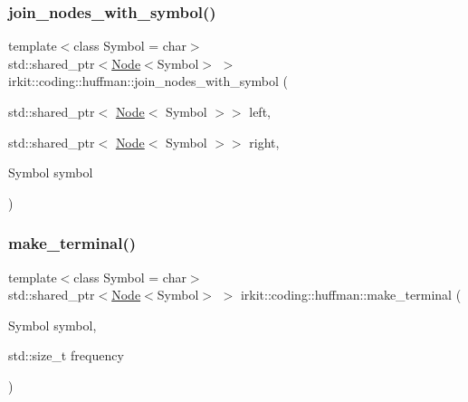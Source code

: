 \mbox{\label{namespaceirkit_1_1coding_1_1huffman_abf6495ba74b7d8d41655b97400a3018a}} 
\subsubsection{\texorpdfstring{join\+\_\+nodes\+\_\+with\+\_\+symbol()}{join\_nodes\_with\_symbol()}}
{\footnotesize\ttfamily template$<$class Symbol  = char$>$ \\
std\+::shared\+\_\+ptr$<$\mbox{\hyperlink{structirkit_1_1coding_1_1huffman_1_1Node}{Node}}$<$Symbol$>$ $>$ irkit\+::coding\+::huffman\+::join\+\_\+nodes\+\_\+with\+\_\+symbol (\begin{DoxyParamCaption}\item[{std\+::shared\+\_\+ptr$<$ \mbox{\hyperlink{structirkit_1_1coding_1_1huffman_1_1Node}{Node}}$<$ Symbol $>$$>$}]{left,  }\item[{std\+::shared\+\_\+ptr$<$ \mbox{\hyperlink{structirkit_1_1coding_1_1huffman_1_1Node}{Node}}$<$ Symbol $>$$>$}]{right,  }\item[{Symbol}]{symbol }\end{DoxyParamCaption})}

\mbox{\label{namespaceirkit_1_1coding_1_1huffman_a33c76a9acb32650215d101ee1d39918f}} 
\subsubsection{\texorpdfstring{make\+\_\+terminal()}{make\_terminal()}}
{\footnotesize\ttfamily template$<$class Symbol  = char$>$ \\
std\+::shared\+\_\+ptr$<$\mbox{\hyperlink{structirkit_1_1coding_1_1huffman_1_1Node}{Node}}$<$Symbol$>$ $>$ irkit\+::coding\+::huffman\+::make\+\_\+terminal (\begin{DoxyParamCaption}\item[{Symbol}]{symbol,  }\item[{std\+::size\+\_\+t}]{frequency }\end{DoxyParamCaption})}

